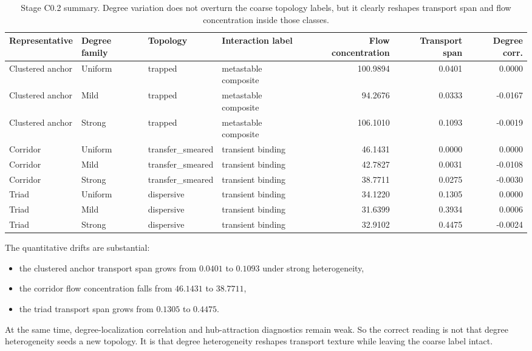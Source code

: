 \documentclass[11pt]{article}
\begin{document}
\begin{table}[t]
\centering
\scriptsize
\begin{tabular}{@{}llllrrr@{}}
\toprule
Representative & Degree family & Topology & Interaction label & Flow concentration & Transport span & Degree corr. \\
\midrule
Clustered anchor & Uniform & trapped & metastable composite & 100.9894 & 0.0401 & 0.0000 \\
Clustered anchor & Mild & trapped & metastable composite & 94.2676 & 0.0333 & -0.0167 \\
Clustered anchor & Strong & trapped & metastable composite & 106.1010 & 0.1093 & -0.0019 \\
Corridor & Uniform & transfer\_smeared & transient binding & 46.1431 & 0.0000 & 0.0000 \\
Corridor & Mild & transfer\_smeared & transient binding & 42.7827 & 0.0031 & -0.0108 \\
Corridor & Strong & transfer\_smeared & transient binding & 38.7711 & 0.0275 & -0.0030 \\
Triad & Uniform & dispersive & transient binding & 34.1220 & 0.1305 & 0.0000 \\
Triad & Mild & dispersive & transient binding & 31.6399 & 0.3934 & 0.0006 \\
Triad & Strong & dispersive & transient binding & 32.9102 & 0.4475 & -0.0024 \\
\bottomrule
\end{tabular}
\caption{Stage C0.2 summary. Degree variation does not overturn the coarse topology labels, but it clearly reshapes transport span and flow concentration inside those classes.}
\label{tab:c02}
\end{table}

The quantitative drifts are substantial:
\begin{itemize}
\item the clustered anchor transport span grows from $0.0401$ to $0.1093$ under strong heterogeneity,
\item the corridor flow concentration falls from $46.1431$ to $38.7711$,
\item the triad transport span grows from $0.1305$ to $0.4475$.
\end{itemize}

At the same time, degree-localization correlation and hub-attraction diagnostics remain weak. So the correct reading is not that degree heterogeneity seeds a new topology. It is that degree heterogeneity reshapes transport texture while leaving the coarse label intact.
\end{document}

